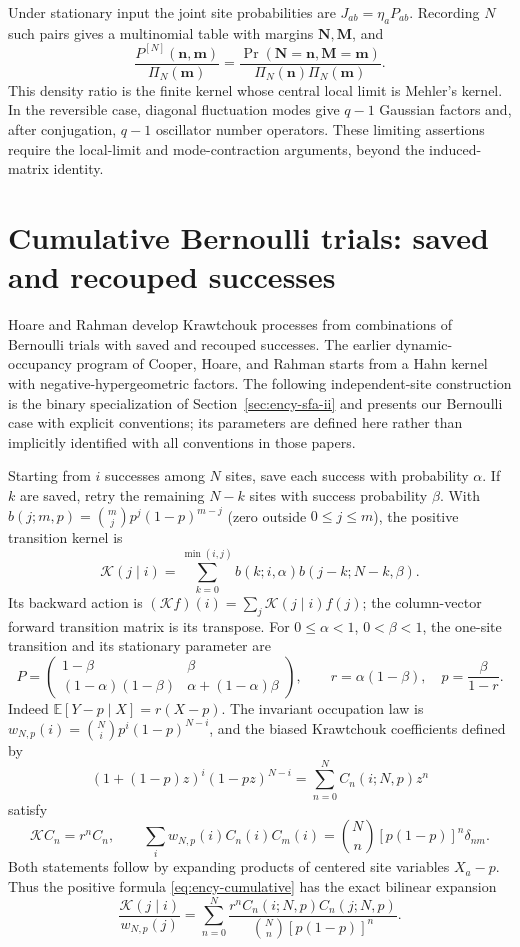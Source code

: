\documentclass[11pt,reqno]{amsart}
\begin{document}
Under stationary input the joint site probabilities are
$J_{ab}=\eta_aP_{ab}$. Recording $N$ such pairs gives a multinomial table
with margins $\mathbf N,\mathbf M$, and
\[
\frac{P^{[N]}(\mathbf n,\mathbf m)}{\Pi_N(\mathbf m)}
=\frac{\Pr(\mathbf N=\mathbf n,\mathbf M=\mathbf m)}
{\Pi_N(\mathbf n)\Pi_N(\mathbf m)}.
\]
This density ratio is the finite kernel whose central local limit is
Mehler's kernel. In the reversible case, diagonal fluctuation modes
give $q-1$ Gaussian factors and, after conjugation, $q-1$ oscillator
number operators. These limiting assertions require the local-limit
and mode-contraction arguments, beyond the induced-matrix identity.

\section{Cumulative Bernoulli trials: saved and recouped successes}
\label{sec:cumulative-bernoulli}
Hoare and Rahman \cite{HoareRahman1984} develop Krawtchouk processes
from combinations of Bernoulli trials with saved and recouped successes.
The earlier dynamic-occupancy program of Cooper, Hoare, and Rahman
\cite{CooperHoareRahman1977} starts from a Hahn kernel with
negative-hypergeometric factors. The following independent-site
construction is the binary specialization of Section~\ref{sec:ency-sfa-ii}
and presents our Bernoulli case with explicit conventions;
its parameters are defined here rather than implicitly identified with
all conventions in those papers.

Starting from $i$ successes among $N$ sites, save each success with
probability $\alpha$. If $k$ are saved, retry the remaining $N-k$ sites
with success probability $\beta$. With
$b(j;m,p)=\binom mjp^j(1-p)^{m-j}$ (zero outside $0\le j\le m$), the
positive transition kernel is
\begin{equation}\label{eq:ency-cumulative}
\mathcal K(j\mid i)=\sum_{k=0}^{\min(i,j)}
b(k;i,\alpha)b(j-k;N-k,\beta).
\end{equation}
Its backward action is $(\mathcal Kf)(i)=\sum_j\mathcal K(j\mid i)f(j)$;
the column-vector forward transition matrix is its transpose.
For $0\le\alpha<1$, $0<\beta<1$, the one-site transition and its
stationary parameter are
\[
P=\begin{pmatrix}1-\beta&\beta\\
(1-\alpha)(1-\beta)&\alpha+(1-\alpha)\beta\end{pmatrix},\qquad
r=\alpha(1-\beta),\quad p=\frac{\beta}{1-r}.
\]
Indeed $\mathbb E[Y-p\mid X]=r(X-p)$. The invariant occupation law is
$w_{N,p}(i)=\binom Ni p^i(1-p)^{N-i}$, and the biased Krawtchouk
coefficients defined by
\[
(1+(1-p)z)^i(1-pz)^{N-i}=\sum_{n=0}^NC_n(i;N,p)z^n
\]
satisfy
\[
\mathcal KC_n=r^nC_n,\qquad
\sum_iw_{N,p}(i)C_n(i)C_m(i)=\binom Nn[p(1-p)]^n\delta_{nm}.
\]
Both statements follow by expanding products of centered site variables
$X_a-p$. Thus the positive formula \eqref{eq:ency-cumulative} has the
exact bilinear expansion
\begin{equation}\label{eq:ency-cumulative-spectral}
\frac{\mathcal K(j\mid i)}{w_{N,p}(j)}
=\sum_{n=0}^N\frac{r^nC_n(i;N,p)C_n(j;N,p)}{\binom Nn[p(1-p)]^n}.
\end{equation}
\end{document}

